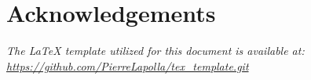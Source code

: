 \maketitle
\tableofcontents

\section*{Acknowledgements}\label{sec:acknowledgements}
\lipsum[1]

\vfill
\begin{center}
    \textit{The \LaTeX{} template utilized for this document is available at:
    \url{https://github.com/PierreLapolla/tex_template.git}}
\end{center}
\newpage